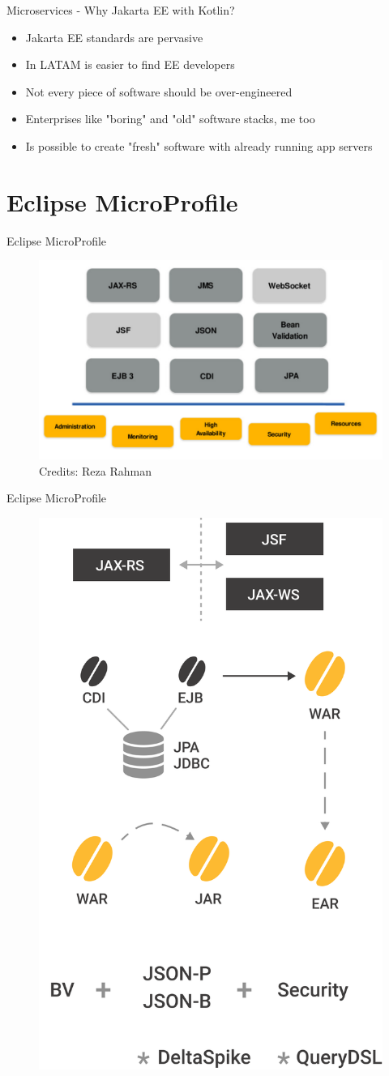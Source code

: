 \documentclass[aspectratio=169]{beamer}
\begin{document}
\begin{frame}{Microservices - Why Jakarta EE with Kotlin?}

	\begin{itemize}
		\item Jakarta EE standards are pervasive
		\item In LATAM is easier to find EE developers
		\item Not every piece of software should be over-engineered
		\item Enterprises like "boring" and "old" software stacks, me too
		\item Is possible to create "fresh" software with already running app servers 
	\end{itemize}

\end{frame}


\section{Eclipse MicroProfile}

\begin{frame}{Eclipse MicroProfile}
\begin{figure}
	\centering
	\includegraphics[width=0.7\linewidth]{Images/javaeemicropancake}
	\caption{Credits: Reza Rahman}
\end{figure}
\end{frame}

\begin{frame}{Eclipse MicroProfile}
	\begin{figure}
		\centering
		\includegraphics[width=0.35\linewidth]{Images/oldsetup}
	\end{figure}
\end{frame}
\end{document}
